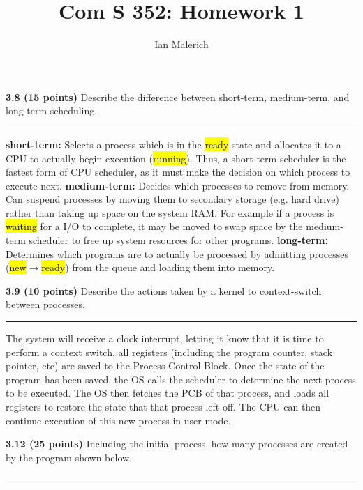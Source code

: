 \documentclass[12pt]{jhwhw}
\author{Ian Malerich}
\title{Com S 352: Homework 1}
\begin{document}
\raggedright

\textbf{3.8 (15 points)} Describe the difference between short-term, medium-term, and 
	long-term scheduling.
\textcolor[RGB]{240,240,240}{\rule{\textwidth}{0.5pt}}\bigbreak

	\begin{addmargin}[1em]{}
		\textbf{short-term:} Selects a process which is in the \hl{ready} state 
			and allocates it to a CPU to actually begin execution (\hl{running}). 
			Thus, a short-term scheduler is the fastest form of CPU scheduler, 
			as it must make the decision on which process to execute next.
		\bigbreak
		\textbf{medium-term:} Decides which processes to remove from memory.
			Can suspend processes by moving them to secondary storage (e.g. 
			hard drive) rather than taking up space on the system RAM.
			For example if a process is \hl{waiting} for a I/O to complete,
			it may be moved to swap space by the medium-term scheduler to free
			up system resources for other programs.
		\bigbreak
		\textbf{long-term:} Determines which programs are to actually be processed
			by admitting processes (\hl{new}$\rightarrow$\hl{ready})
			from the queue and loading them into memory.
	\end{addmargin}

\bigbreak
\textbf{3.9 (10 points)} Describe the actions taken by a kernel to context-switch
	between processes.
\textcolor[RGB]{240,240,240}{\rule{\textwidth}{0.5pt}}\bigbreak

	\begin{addmargin}[1em]{}
		The system will receive a clock interrupt, letting it know that it is time
		to perform a context switch, all registers (including the program counter, stack
		pointer, etc) are saved to the Process Control Block. Once the state of the program 
		has been saved, the OS calls the scheduler to determine the next process to be
		executed. The OS then fetches the PCB of that process, and loads all registers
		to restore the state that that process left off. The CPU can then continue
		execution of this new process in user mode.
	\end{addmargin}

\bigbreak
\textbf{3.12 (25 points)} Including the initial process, how many processes are created by 
	the program shown below.
\inputminted{c}{3.12.c}
\textcolor[RGB]{240,240,240}{\rule{\textwidth}{0.5pt}}\bigbreak
\end{document}
